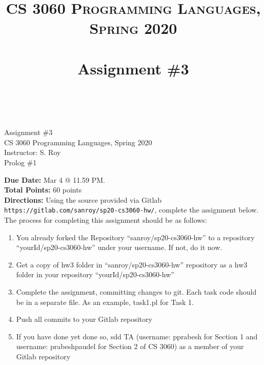 \documentclass[paper=letter, fontsize=11pt]{scrartcl} %
\title{ 
    \normalfont \normalsize 
    \textsc{CS 3060 Programming Languages, Spring 2020} \\ [25pt] %
    \horrule{0.5pt} \\[0.4cm] %
    \huge Assignment \#3  \\ %
    \horrule{2pt} \\[0.5cm] %
}
\begin{document}
    \begin{center}
         Assignment \#3\\
        \small CS 3060 Programming Languages, Spring 2020 \\
        \small Instructor: S. Roy \\
        \huge Prolog \#1
    \end{center}
    
    \textbf{Due Date:} Mar 4 @ 11.59 PM. \\
    \textbf{Total Points:} 60 points \\

    \textbf{Directions:} Using the source provided via Gitlab \@ \texttt{https://gitlab.com/sanroy/sp20-cs3060-hw/},
complete the assignment below. The process for completing this assignment should be as follows:

    \begin{enumerate}[noitemsep]
        \item You already forked the Repository ``sanroy/sp20-cs3060-hw'' to a repository ``yourId/sp20-cs3060-hw'' under your username. If not, do it now.
        \item Get a copy of hw3 folder in ``sanroy/sp20-cs3060-hw'' repository as a hw3 folder in your repository ``yourId/sp20-cs3060-hw''
        \item Complete the assignment, committing changes to git. Each task code should be in a separate file. As an example, task1.pl for Task 1.
        \item Push all commits to your Gitlab repository
        \item If you have done yet done so, sdd TA (username: pprabesh for Section 1 and username: prabeshpaudel for Section 2 of CS 3060) as a member of your Gitlab repository
    \end{enumerate}
\end{document}
